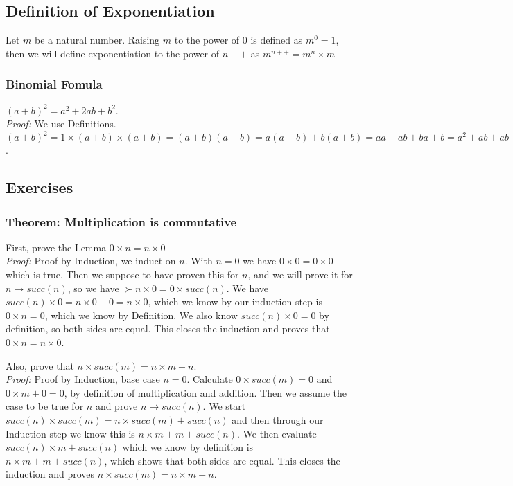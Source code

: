 \subsection{Definition of Exponentiation}
Let $m$ be a natural number. Raising $m$ to the power of $0$ is defined as $m^0 = 1$, then we will define exponentiation to the power of $n++$ as $m^{n++} = m^n \times m$

\subsubsection*{Binomial Fomula}
$(a+b)^2 = a^2 + 2ab + b^2$.\\
\textit{Proof:} We use Definitions. $(a+b)^2 = 1\times(a+b)\times(a+b) = (a+b)(a+b) = a(a+b) + b(a+b) = aa + ab + ba + b = a^2 + ab + ab + b^2 = a^2 + 2ab + b^2$.



\subsection{Exercises}
\subsubsection*{Theorem: Multiplication is commutative}
First, prove the Lemma $0 \times n = n \times 0$\\
\textit{Proof:} Proof by Induction, we induct on $n$. With $n = 0$ we have $0 \times 0 = 0 \times 0$ which is true. Then we suppose to have proven this for $n$, and we will prove it for $n\rightarrow succ(n)$, so we have $\succ n \times 0 = 0 \times succ(n)$. We have $succ(n)\times 0 = n\times 0 + 0 = n\times0$, which we know by our induction step is $0\times n = 0$, which we know by Definition. We also know $succ(n) \times 0 = 0$ by definition, so both sides are equal. This closes the induction and proves that $0\times n = n\times0$.

Also, prove that $n \times succ(m) = n \times m + n$.\\
\textit{Proof:} Proof by Induction, base case $n = 0$. Calculate $0 \times succ(m) = 0$ and $0 \times m + 0 = 0$, by definition of multiplication and addition. Then we assume the case to be true for $n$ and prove $n\rightarrow succ(n)$. We start $succ(n) \times succ(m) = n \times succ(m) + succ(n)$ and then through our Induction step we know this is $n \times m + m + succ(n)$. We then evaluate $succ(n) \times m + succ(n)$ which we know by definition is $n \times m + m + succ(n)$, which shows that both sides are equal. This closes the induction and proves $n\times succ(m) = n\times m + n$.

